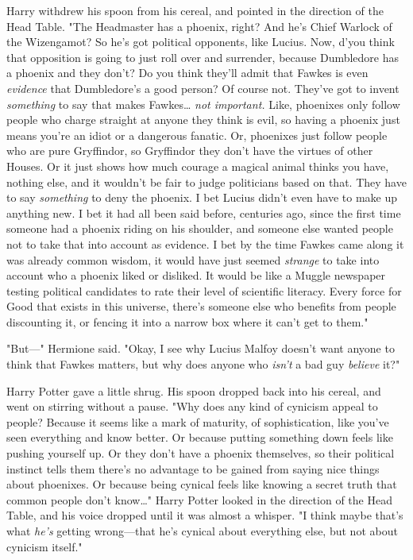 Harry withdrew his spoon from his cereal, and pointed in the direction of the 
Head Table. "The Headmaster has a phoenix, right? And he's Chief Warlock of the 
Wizengamot? So he's got political opponents, like Lucius. Now, d'you think that 
opposition is going to just roll over and surrender, because Dumbledore has a 
phoenix and they don't? Do you think they'll admit that Fawkes is even 
\emph{evidence} that Dumbledore's a good person? Of course not. They've got to 
invent \emph{something} to say that makes Fawkes{\ldots} \emph{not important.} 
Like, phoenixes only follow people who charge straight at anyone they think is 
evil, so having a phoenix just means you're an idiot or a dangerous fanatic. 
Or, phoenixes just follow people who are pure Gryffindor, so Gryffindor they 
don't have the virtues of other Houses. Or it just shows how much courage a 
magical animal thinks you have, nothing else, and it wouldn't be fair to judge 
politicians based on that. They have to say \emph{something} to deny the 
phoenix. I bet Lucius didn't even have to make up anything new. I bet it had 
all been said before, centuries ago, since the first time someone had a phoenix 
riding on his shoulder, and someone else wanted people not to take that into 
account as evidence. I bet by the time Fawkes came along it was already common 
wisdom, it would have just seemed \emph{strange} to take into account who a 
phoenix liked or disliked. It would be like a Muggle newspaper testing 
political candidates to rate their level of scientific literacy. Every force 
for Good that exists in this universe, there's someone else who benefits from 
people discounting it, or fencing it into a narrow box where it can't get to 
them."

"But---" Hermione said. "Okay, I see why Lucius Malfoy doesn't want anyone to 
think that Fawkes matters, but why does anyone who \emph{isn't} a bad guy 
\emph{believe} it?"

Harry Potter gave a little shrug. His spoon dropped back into his cereal, and 
went on stirring without a pause. "Why does any kind of cynicism appeal to 
people? Because it seems like a mark of maturity, of sophistication, like 
you've seen everything and know better. Or because putting something down feels 
like pushing yourself up. Or they don't have a phoenix themselves, so their 
political instinct tells them there's no advantage to be gained from saying 
nice things about phoenixes. Or because being cynical feels like knowing a 
secret truth that common people don't know{\ldots}" Harry Potter looked in the 
direction of the Head Table, and his voice dropped until it was almost a 
whisper. "I think maybe that's what \emph{he's} getting wrong---that he's 
cynical about everything else, but not about cynicism itself."

